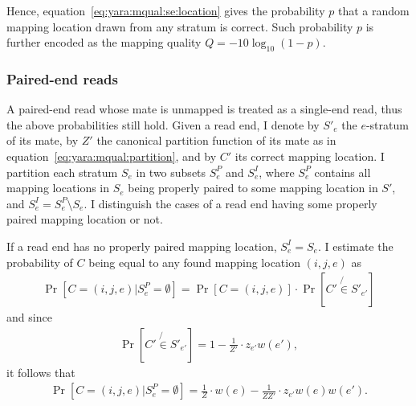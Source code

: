 
Hence, equation~\ref{eq:yara:mqual:se:location} gives the probability $p$ that a random mapping location drawn from any stratum is correct.
Such probability $p$ is further encoded as the mapping quality $Q=-10 \log_{10}(1-p)$.

\subsubsection{Paired-end reads}

A paired-end read whose mate is unmapped is treated as a single-end read, thus the above probabilities still hold.
Given a read end, I denote by $S'_e$ the $e$-stratum of its mate, by $Z'$ the canonical partition function of its mate as in equation~\ref{eq:yara:mqual:partition}, and by $C'$ its correct mapping location.
I partition each stratum $S_e$ in two subsets $S^P_e$ and $S^I_e$, where $S^P_e$ contains all mapping locations in $S_e$ being properly paired to some mapping location in $S'$, and $S^I_e = S^P_e \setminus S_e$.
I distinguish the cases of a read end having some properly paired mapping location or not.

If a read end has no properly paired mapping location, $S^I_e = S_e$.
I estimate the probability of $C$ being equal to any found mapping location $(i,j,e)$ as
\begin{eqnarray}
\Pr[C = (i,j,e) | S^P_e = \emptyset] = \Pr[C = (i,j,e)] \cdot \Pr[C' \not{\in} S'_{e'}]
\end{eqnarray}
and since
\begin{eqnarray}
\Pr[C' \not{\in} S'_{e'}] = 1 - \frac{1}{Z'} \cdot z_{e'} w(e'),
\end{eqnarray}
it follows that
\begin{eqnarray}
\label{eq:yara:mqual:pe:unpaired}
\Pr[C = (i,j,e) | S^P_e = \emptyset] = \frac{1}{Z} \cdot w(e) - \frac{1}{ZZ'} \cdot z_{e'} w(e) w(e').
\end{eqnarray}

